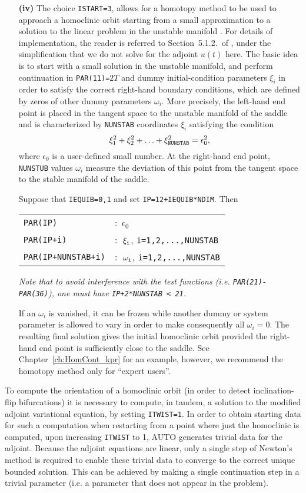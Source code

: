 \documentclass[12pt]{report}
\def\eps{\epsilon}
\begin{document}
\begin{itemize}
\item[{\bf(iv)}]
The choice {\tt ISTART=3}, allows for
a homotopy method to be used to approach a homoclinic orbit
starting from a small approximation to a solution to the 
linear problem in the unstable manifold \cite{DoFrMo:93}. For
details of implementation, the reader is referred to 
Section~5.1.2.\ of , under the simplification
that we do not solve for the adjoint $u(t)$ here. The basic idea
is to start with a small solution in the unstable manifold, and perform
continuation in {\tt PAR(11)=}$2T$ and dummy initial-condition 
parameters $\xi_i$ in order to satisfy the correct right-hand boundary
conditions, which are defined by zeros of other dummy parameters
$\omega_i$. More precisely, the left-hand end point is placed in the
tangent space to the unstable manifold of the saddle and is characterized by
{\tt NUNSTAB} coordinates $\xi_i$ satisfying the condition
$$
\xi_1^2 + \xi_2^2 + \ldots +\xi_{\tt NUNSTAB}^2  = \eps_0^2,
$$
where $\eps_0$ is a user-defined small number.
At the right-hand end point, {\tt NUNSTUB} values $\omega_i$ 
measure the deviation of this point from the tangent
space to the stable manifold of the saddle. 
\par
Suppose that {\tt IEQUIB=0,1} and set {\tt IP=12+IEQUIB*NDIM}. Then
\par
\medskip
\begin{center}
\begin{tabular}{ll}
{\tt PAR(IP)} & :$\ \ \eps_0$\\
{\tt PAR(IP+i)} &  :$\ \ \xi_{\tt i}$, {\tt i=1,2,...,NUNSTAB}\\
{\tt PAR(IP+NUNSTAB+i)} & :$\ \ \omega_{\tt i}$, {\tt i=1,2,...,NUNSTAB}
\end{tabular}
\end{center}
\par
\medskip
{\it Note that to avoid interference with the test functions 
(i.e. {\tt PAR(21)-PAR(36)}), one must have {\tt IP+2*NUNSTAB < 21}.} 
\par
If an $\omega_i$ is vanished, it can be frozen while another dummy or system parameter is allowed to
vary in order to make consequently all $\omega_i=0$. The resulting final solution
gives the initial homoclinic orbit provided the right-hand end point
is sufficiently close to the saddle. 
See Chapter~\ref{ch:HomCont_kpr} for an example, 
however, we recommend the homotopy method only for ``expert users''.
\end{itemize}

To compute the orientation of a homoclinic orbit (in order to detect
inclination-flip bifurcations) it is necessary to compute, in tandem,
a solution to the modified adjoint variational equation, by setting
{\tt ITWIST=1}. In order to obtain starting data for such a
computation when restarting from a point where just the homoclinic
is computed, upon increasing {\tt ITWIST} to 1, {\cal AUTO} generates
trivial data for the adjoint. Because the adjoint equations are
linear, only a single step of Newton's method is required to
enable these trivial data to converge to the correct unique bounded
solution. This can be achieved by making a single continuation step in a
trivial parameter (i.e. a parameter that does not appear
in the problem). 
\end{document}
